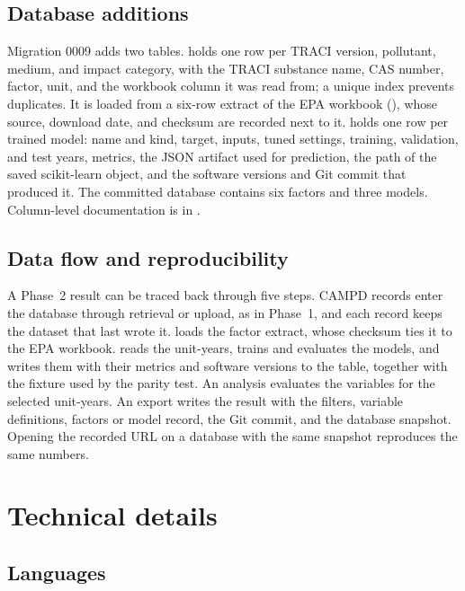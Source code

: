 \documentclass[11pt,a4paper]{article}
\begin{document}
\subsection{Database additions}

Migration 0009 adds two tables.  holds one row per TRACI version,
pollutant, medium, and impact category, with the TRACI substance name, CAS number, factor, unit,
and the workbook column it was read from; a unique index prevents duplicates. It is loaded from
a six-row extract of the EPA workbook (), whose source,
download date, and checksum are recorded next to it.  holds one row per trained
model: name and kind, target, inputs, tuned settings, training, validation, and test years,
metrics, the JSON artifact used for prediction, the path of the saved scikit-learn object, and
the software versions and Git commit that produced it. The committed database contains six
factors and three models. Column-level documentation is in .

\subsection{Data flow and reproducibility}

A Phase~2 result can be traced back through five steps. CAMPD records enter the database
through retrieval or upload, as in Phase~1, and each record keeps the dataset that last wrote
it.  loads the factor extract, whose checksum ties it to the EPA
workbook.  reads the unit-years, trains and evaluates the models, and
writes them with their metrics and software versions to the  table, together with
the fixture used by the parity test. An analysis evaluates the variables for the selected
unit-years. An export writes the result with the filters, variable definitions, factors or model
record, the Git commit, and the database snapshot. Opening the recorded URL on a database with
the same snapshot reproduces the same numbers.

\section{Technical details}
\label{sec:technical}

\subsection{Languages}
\end{document}
